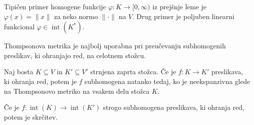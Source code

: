 \documentclass[mat2, tisk]{fmfdelo}
\begin{document}
Tipičen primer homogene funkcije
$\varphi:K\longrightarrow[0,\infty)$ iz prejšnje
leme je $\varphi(x)=\|x\|$ za neko normo
$\|\cdot\|$ na $V$.
Drug primer je poljuben linearni funkcional
$\varphi\in\operatorname{int}(K^*)$.

Thompsonova metrika je najbolj uporabna pri preučevanju subhomogenih
preslikav, ki ohranjajo red, na celotnem stožcu.

\begin{lema}\label{lema3.12}
Naj bosta $K\subseteq V$ in $K'\subseteq V'$ strnjena zaprta stožca. Če
je $f:K\longrightarrow K'$ preslikava, ki ohranja red, potem je $f$
subhomogena natanko tedaj, ko je neekspanzivna glede na Thompsonovo
metriko na vsakem delu stožca $K$.

Če je
$f:\operatorname{int}(K)\longrightarrow\operatorname{int}(K')$
strogo subhomogena preslikava, ki ohranja red, potem je skrčitev.
\end{lema}
\end{document}
